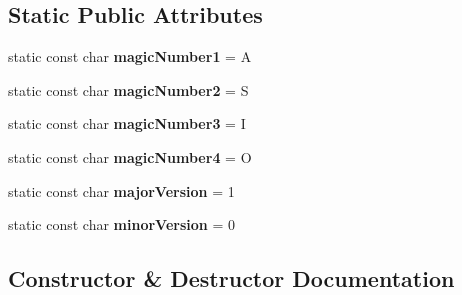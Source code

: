 \subsection*{Static Public Attributes}
\begin{DoxyCompactItemize}
\item 
static const char {\bfseries magic\+Number1} = \textquotesingle{}A\textquotesingle{}\hypertarget{struct_messaging_1_1_message_1_1_message_header_ab7d9a533bcbcc875e0c71a854a8d3d7f}{}\label{struct_messaging_1_1_message_1_1_message_header_ab7d9a533bcbcc875e0c71a854a8d3d7f}

\item 
static const char {\bfseries magic\+Number2} = \textquotesingle{}S\textquotesingle{}\hypertarget{struct_messaging_1_1_message_1_1_message_header_abfc4eabe7cc23af31fcf67be7d3f71bd}{}\label{struct_messaging_1_1_message_1_1_message_header_abfc4eabe7cc23af31fcf67be7d3f71bd}

\item 
static const char {\bfseries magic\+Number3} = \textquotesingle{}I\textquotesingle{}\hypertarget{struct_messaging_1_1_message_1_1_message_header_a24692db229162cdaf60b3b7ec52a98f2}{}\label{struct_messaging_1_1_message_1_1_message_header_a24692db229162cdaf60b3b7ec52a98f2}

\item 
static const char {\bfseries magic\+Number4} = \textquotesingle{}O\textquotesingle{}\hypertarget{struct_messaging_1_1_message_1_1_message_header_a59e0cecbb4cb66668d6a75cc57c884c8}{}\label{struct_messaging_1_1_message_1_1_message_header_a59e0cecbb4cb66668d6a75cc57c884c8}

\item 
static const char {\bfseries major\+Version} = \textquotesingle{}1\textquotesingle{}\hypertarget{struct_messaging_1_1_message_1_1_message_header_aa5c450f8bd19792759093880a748c014}{}\label{struct_messaging_1_1_message_1_1_message_header_aa5c450f8bd19792759093880a748c014}

\item 
static const char {\bfseries minor\+Version} = \textquotesingle{}0\textquotesingle{}\hypertarget{struct_messaging_1_1_message_1_1_message_header_ad4d770dcf9125f64181d9373c9a324fd}{}\label{struct_messaging_1_1_message_1_1_message_header_ad4d770dcf9125f64181d9373c9a324fd}

\end{DoxyCompactItemize}


\subsection{Constructor \& Destructor Documentation}

